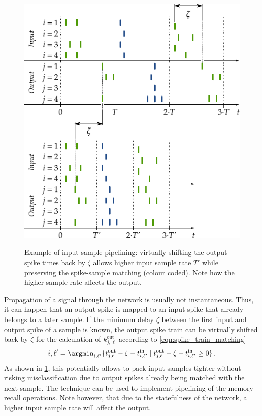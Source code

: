 \begin{figure}
	\centering
	\vspace*{0.575cm}
	\includegraphics{media/chp3/spike_train_shift.pdf}\\
	\vspace*{0.575cm}
	\caption[Example of input sample pipelining]{Example of input sample pipelining: virtually shifting the output spike times back by $\zeta$ allows higher input sample rate $T'$ while preserving the spike-sample matching (colour coded). Note how the higher sample rate affects the output.}
	\label{fig:spike_train_shift}
\end{figure}
Propagation of a signal through the network is usually not instantaneous. Thus, it can happen that an output spike is mapped to an input spike that already belongs to a later sample. If the minimum delay $\zeta$ between the first input and output spike of a sample is known, the output spike train can be virtually shifted back by $\zeta$ for the calculation of $k^{\mathrm{out}}_{j, \ell}$ according to \cref{eqn:spike_train_matching}
\begin{align}
	i, \ell' = \argmin_{i, \ell'}\{t^{\mathrm{out}}_{j,\ell} - \zeta - t^{\mathrm{in}}_{i,\ell'} \mid t^{\mathrm{out}}_{j,\ell} - \zeta - t^{\mathrm{in}}_{i,\ell'} \geq 0 \} \,.
\end{align}
As shown in \cref{fig:spike_train_shift}, this potentially allows to pack input samples tighter without risking misclassification due to output spikes already being matched with the next sample. The technique can be used to implement pipelining of the memory recall operations. Note however, that due to the statefulness of the network, a higher input sample rate will affect the output.

